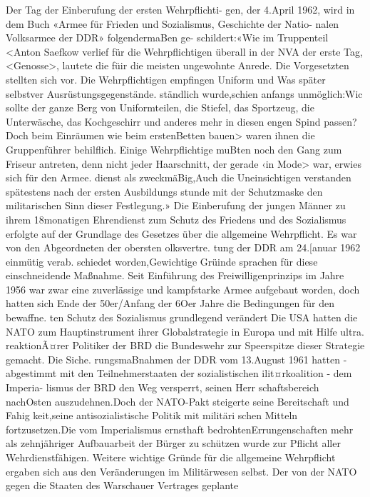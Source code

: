 

Der Tag der Einberufung der ersten Wehrpflichti-
gen, der 4.April 1962, wird in dem Buch «Armee
für Frieden und Sozialismus, Geschichte der Natio-
nalen Volksarmee der DDR» folgendermaBen ge-
schildert:«Wie im Truppenteil <Anton Saefkow
verlief für die Wehrpflichtigen überall in der NVA der erste Tag, <Genosse>, lautete die füir die meisten
ungewohnte Anrede. Die Vorgesetzten stellten sich
vor. Die Wehrpflichtigen empfingen Uniform und
Was später selbstver
Ausrüstungsgegenstände.
ständlich wurde,schien anfangs unmöglich:Wic
sollte der ganze Berg von Uniformteilen, die Stiefel,
das Sportzeug, die Unterwäsche, das Kochgeschirr
und anderes mehr in diesen engen Spind passen?
Doch beim Einräumen wie beim erstenBetten
bauen> waren ihnen die Gruppenführer behilflich.
Einige Wehrpflichtige muBten noch den Gang zum
Friseur antreten, denn nicht jeder Haarschnitt, der
gerade ‹in Mode> war, erwies sich für den Armee.
dienst als zweckmäBig,Auch die Uneinsichtigen
verstanden spätestens nach der ersten Ausbildungs
stunde mit der Schutzmaske den militarischen Sinn
dieser Festlegung.»
Die Einberufung der jungen Männer zu ihrem
18monatigen Ehrendienst zum Schutz des Friedens
und des Sozialismus erfolgte auf der Grundlage des
Gesetzes über die allgemeine Wehrpflicht. Es war
von den Abgeordneten der obersten olksvertre.
tung der DDR am 24.[anuar 1962 einmütig verab.
schiedet worden,Gewichtige Grüinde sprachen für
diese einschneidende Maßnahme. Seit Einführung
des Freiwilligenprinzips im Jahre 1956 war zwar
eine zuverlässige und kampfstarke Armee aufgebaut
worden, doch hatten sich Ende der 50er/Anfang
der 6Oer Jahre die Bedingungen für den bewaffne.
ten Schutz des Sozialismus grundlegend verändert
Die USA hatten die NATO zum Hauptinstrument
ihrer Globalstrategie in Europa und mit Hilfe ultra.
reaktionÃ¤rer Politiker der BRD die Bundeswehr zur
Speerspitze dieser Strategie gemacht. Die Siche.
rungsmaBnahmen der DDR vom 13.August 1961
hatten - abgestimmt mit den Teilnehmerstaaten
der sozialistischen ilit¤rkoalition - dem Imperia-
lismus der BRD den Weg versperrt, seinen Herr
schaftsbereich nachOsten auszudehnen.Doch der
NATO-Pakt steigerte seine Bereitschaft und Fahig
keit,seine antisozialistische Politik mit militäri
schen Mitteln fortzusetzen.Die vom Imperialismus
ernsthaft bedrohtenErrungenschaften mehr als zehnjähriger Aufbauarbeit der Bürger zu schützen
wurde zur Pflicht aller Wehrdienstfähigen.
Weitere wichtige Gründe für die allgemeine
Wehrpflicht ergaben sich aus den Veränderungen
im Militärwesen selbst. Der von der NATO gegen
die Staaten des Warschauer Vertrages geplante
